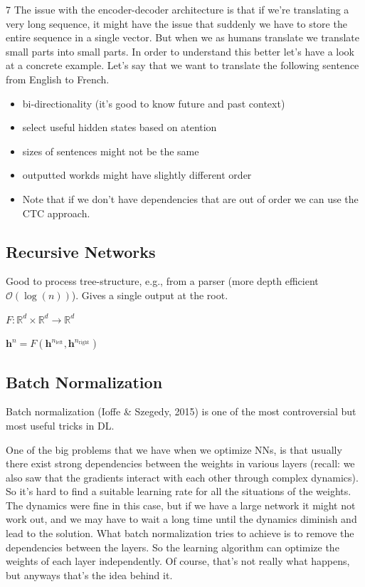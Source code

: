 \documentclass[a2paper,4pt]{extarticle}
\makeatletter
\newcommand{\BigO}{\mathcal{O}}
\newcommand{\R}{\mathbb{R}}
\renewcommand{\vec}[1]{\mathbf{#1}}
\newcommand{\vh}{\vec{h}}
\newcommand*{\mybox}[1]{%
    \noindent\colorbox{sectionbarcolor}{%
        \parbox{\dimexpr\columnwidth-2\fboxsep\relax}{%
            \textcolor{white}{#1}}}}
\newcommand*{\mybox}[1]{%
    \noindent\colorbox{sectioncolor}{%
        \parbox{\dimexpr\columnwidth-2\fboxsep\relax}{%
            \textcolor{white}{#1}}}}
\newcommand{\sectionsizeBefore}{0pt}
\newcommand{\sectionsizeAfter}{0pt}
\newcommand{\sectionsizeFont}{\normalfont}
\newcommand{\sectionsizeBefore}{-8pt}
\newcommand{\sectionsizeAfter}{3pt}
\newcommand{\sectionsizeFont}{\normalfont}
\renewcommand\section{
\@startsection {section}{1}{\z@}{\sectionsizeBefore
}{\sectionsizeAfter
}{\sectionsizeFont\large\bfseries\mybox}}
\makeatother
\begin{document}
\begin{landscape}
\begin{multicols*}{7}
The issue with the encoder-decoder architecture is that if we're translating a
very long sequence, it might have the issue that suddenly we have to store the
entire sequence in a single vector. But when we as humans translate we translate
small parts into small parts. In order to understand this better let's have a
look at a concrete example. Let's say that we want to translate the following
sentence from English to French.
\begin{itemize}
  \item bi-directionality (it's good to know future and past context)
  \item select useful hidden states based on atention
  \item sizes of sentences might not be the same
  \item outputted workds might have slightly different order
  \item Note that if we don't have dependencies that are out of order we can use
  the CTC approach.
\end{itemize}

\subsection{Recursive Networks}

Good to process tree-structure, e.g., from a parser (more depth efficient
$\BigO(\log(n))$). Gives a single output at the root.

$F\colon\R^d\times\R^d\to\R^d$

$\vh^n=F(\vh^{n_{\text{left}}},\vh^{n_{\text{right}}})$

\section{Deep Gradients}

\subsection{Batch Normalization}

Batch normalization (Ioffe \& Szegedy, 2015) is one of the most controversial
but most useful tricks in DL. 

One of the big problems that we have when we optimize NNs, is that usually there
exist strong dependencies between the weights in various layers (recall: we also
saw that the gradients interact with each other through complex dynamics). So
it's hard to find a suitable learning rate for all the situations of the
weights. The dynamics were fine in this case, but if we have a large network it
might not work out, and we may have to wait a long time until the dynamics
diminish and lead to the solution. What batch normalization tries to achieve is
to remove the dependencies between the layers. So the learning algorithm can
optimize the weights of each layer independently. Of course, that's not really
what happens, but anyways that's the idea behind it.


\end{multicols*}
\end{landscape}
\end{document}
